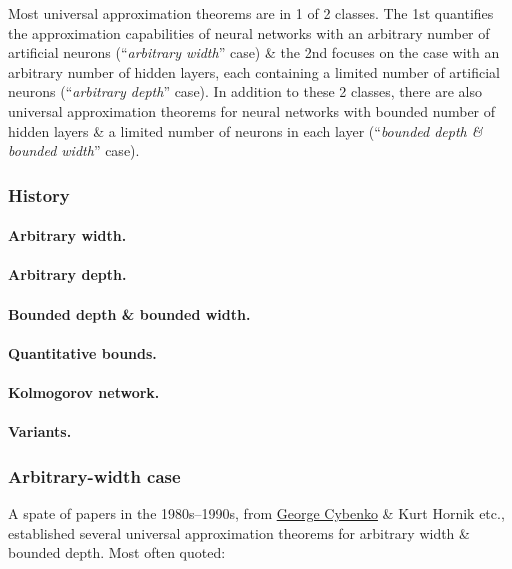 \documentclass{article}
\begin{document}
Most universal approximation theorems are in 1 of 2 classes. The 1st quantifies the approximation capabilities of neural networks with an arbitrary number of artificial neurons (``{\it arbitrary width}'' case) \& the 2nd focuses on the case with an arbitrary number of hidden layers, each containing a limited number of artificial neurons (``{\it arbitrary depth}'' case). In addition to these 2 classes, there are also universal approximation theorems for neural networks with bounded number of hidden layers \& a limited number of neurons in each layer (``{\it bounded depth \& bounded width}'' case).

\subsubsection{History}

\paragraph{Arbitrary width.}

\paragraph{Arbitrary depth.}

\paragraph{Bounded depth \& bounded width.}

\paragraph{Quantitative bounds.}

\paragraph{Kolmogorov network.}

\paragraph{Variants.}

\subsubsection{Arbitrary-width case}
A spate of papers in the 1980s--1990s, from \href{https://en.wikipedia.org/wiki/George_Cybenko}{George Cybenko} \& Kurt Hornik etc., established several universal approximation theorems for arbitrary width \& bounded depth. Most often quoted:
\end{document}
